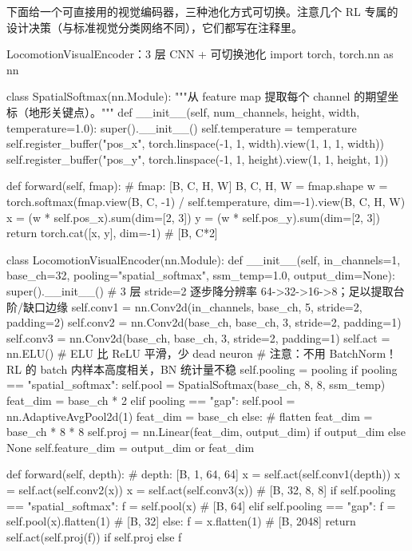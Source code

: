 下面给一个可直接用的视觉编码器，三种池化方式可切换。注意几个 RL 专属的设计决策（与标准视觉分类网络不同），它们都写在注释里。

\begin{codebox}[Python]{LocomotionVisualEncoder：3 层 CNN + 可切换池化}
import torch, torch.nn as nn

class SpatialSoftmax(nn.Module):
    """从 feature map 提取每个 channel 的期望坐标（地形关键点）。"""
    def __init__(self, num_channels, height, width, temperature=1.0):
        super().__init__()
        self.temperature = temperature
        self.register_buffer("pos_x",
            torch.linspace(-1, 1, width).view(1, 1, 1, width))
        self.register_buffer("pos_y",
            torch.linspace(-1, 1, height).view(1, 1, height, 1))

    def forward(self, fmap):                    # fmap: [B, C, H, W]
        B, C, H, W = fmap.shape
        w = torch.softmax(fmap.view(B, C, -1) / self.temperature,
                          dim=-1).view(B, C, H, W)
        x = (w * self.pos_x).sum(dim=[2, 3])
        y = (w * self.pos_y).sum(dim=[2, 3])
        return torch.cat([x, y], dim=-1)         # [B, C*2]

class LocomotionVisualEncoder(nn.Module):
    def __init__(self, in_channels=1, base_ch=32,
                 pooling="spatial_softmax", ssm_temp=1.0, output_dim=None):
        super().__init__()
        # 3 层 stride=2 逐步降分辨率 64->32->16->8；足以提取台阶/缺口边缘
        self.conv1 = nn.Conv2d(in_channels, base_ch, 5, stride=2, padding=2)
        self.conv2 = nn.Conv2d(base_ch, base_ch, 3, stride=2, padding=1)
        self.conv3 = nn.Conv2d(base_ch, base_ch, 3, stride=2, padding=1)
        self.act = nn.ELU()                       # ELU 比 ReLU 平滑，少 dead neuron
        # 注意：不用 BatchNorm！RL 的 batch 内样本高度相关，BN 统计量不稳
        self.pooling = pooling
        if pooling == "spatial_softmax":
            self.pool = SpatialSoftmax(base_ch, 8, 8, ssm_temp)
            feat_dim = base_ch * 2
        elif pooling == "gap":
            self.pool = nn.AdaptiveAvgPool2d(1)
            feat_dim = base_ch
        else:                                     # flatten
            feat_dim = base_ch * 8 * 8
        self.proj = nn.Linear(feat_dim, output_dim) if output_dim else None
        self.feature_dim = output_dim or feat_dim

    def forward(self, depth):                     # depth: [B, 1, 64, 64]
        x = self.act(self.conv1(depth))
        x = self.act(self.conv2(x))
        x = self.act(self.conv3(x))               # [B, 32, 8, 8]
        if self.pooling == "spatial_softmax":
            f = self.pool(x)                      # [B, 64]
        elif self.pooling == "gap":
            f = self.pool(x).flatten(1)           # [B, 32]
        else:
            f = x.flatten(1)                      # [B, 2048]
        return self.act(self.proj(f)) if self.proj else f
\end{codebox}


